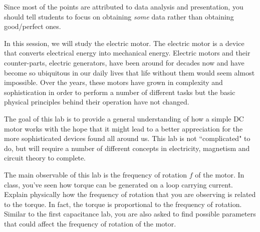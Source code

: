 \documentclass[12pt]{report}
\begin{document}
\begin{tcolorbox}[title=Important Announcement]
Since most of the points are attributed to data analysis and presentation, you should tell students to focus on obtaining \textit{some} data rather than obtaining good/perfect ones.
\end{tcolorbox}

In this session, we will study the electric motor. The electric motor is a device that converts electrical energy into mechanical energy. Electric motors and their counter-parts, electric generators, have been around for decades now and have become so ubiquitous in our daily lives that life without them would seem almost impossible. Over the years, these motors have grown in complexity and sophistication in order to perform a number of different tasks but the basic physical principles behind their operation have not changed.

The goal of this lab is to provide a general understanding of how a simple DC motor works with the hope that it might lead to a better appreciation for the more sophisticated devices found all around us. This lab is not ``complicated" to do, but will require a number of different concepts in electricity, magnetism and circuit theory to complete.

The main observable of this lab is the frequency of rotation $f$ of the motor.
In class, you've seen how torque can be generated on a loop carrying current. {\color{blue} Explain physically how the frequency of rotation that you are observing is related to the torque.} In fact, the torque is proportional to the frequency of rotation.
Similar to the first capacitance lab, you are also asked to find possible parameters that could affect the frequency of rotation of the motor.
\end{document}
